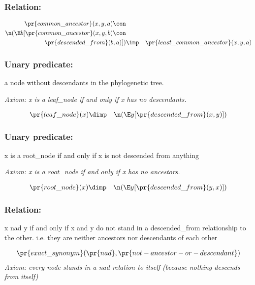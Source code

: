\subsubsection{Relation:  }


\begin{eqnarray*}
 \pr{common\_ancestor}(x, y, a) \con \\
 \n( \E b[ \pr{common\_ancestor}(x, y, b) \con \\
 \pr{descended\_from}(b, a) ])&\imp & \pr{least\_common\_ancestor}(x, y, a) 
\end{eqnarray*}
\subsubsection{Unary predicate:  }


a node without descendants in the phylogenetic tree.

\emph{Axiom: x is a leaf\_node if and only if x has no descendants.}

\begin{eqnarray*}
 \pr{leaf\_node}(x) &\dimp & \n( \E y[ \pr{descended\_from}(x, y) ])
\end{eqnarray*}
\subsubsection{Unary predicate:  }


x is a root\_node if and only if x is not descended from anything

\emph{Axiom: x is a root\_node if and only if x has no ancestors.}

\begin{eqnarray*}
 \pr{root\_node}(x) &\dimp & \n( \E y[ \pr{descended\_from}(y, x) ])
\end{eqnarray*}
\subsubsection{Relation:  }


x nad y if and only if x and y do not stand in a descended\_from relationship to the other. i.e. they are neither ancestors nor descendants of each other

\begin{eqnarray*}
 \pr{exact\_synonym}( \pr{nad},  \pr{not-ancestor-or-descendant}) 
\end{eqnarray*}
\emph{Axiom: every node stands in a nad relation to itself (because nothing descends from itself)}

